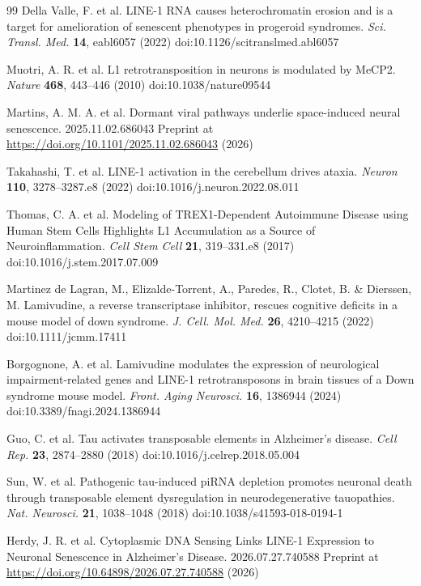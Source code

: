 \documentclass[11pt,twocolumn,twoside]{extarticle}
\begin{document}
\begin{thebibliography}{99}
 Della Valle, F. et al. LINE-1 RNA causes heterochromatin erosion and is a target for amelioration of senescent phenotypes in progeroid syndromes. \textit{Sci. Transl. Med.} \textbf{14}, eabl6057 (2022) doi:10.1126/scitranslmed.abl6057

 Muotri, A. R. et al. L1 retrotransposition in neurons is modulated by MeCP2. \textit{Nature} \textbf{468}, 443--446 (2010) doi:10.1038/nature09544

 Martins, A. M. A. et al. Dormant viral pathways underlie space-induced neural senescence. 2025.11.02.686043 Preprint at \url{https://doi.org/10.1101/2025.11.02.686043} (2026)

 Takahashi, T. et al. LINE-1 activation in the cerebellum drives ataxia. \textit{Neuron} \textbf{110}, 3278--3287.e8 (2022) doi:10.1016/j.neuron.2022.08.011

 Thomas, C. A. et al. Modeling of TREX1-Dependent Autoimmune Disease using Human Stem Cells Highlights L1 Accumulation as a Source of Neuroinflammation. \textit{Cell Stem Cell} \textbf{21}, 319--331.e8 (2017) doi:10.1016/j.stem.2017.07.009

 Martinez de Lagran, M., Elizalde-Torrent, A., Paredes, R., Clotet, B. \& Dierssen, M. Lamivudine, a reverse transcriptase inhibitor, rescues cognitive deficits in a mouse model of down syndrome. \textit{J. Cell. Mol. Med.} \textbf{26}, 4210--4215 (2022) doi:10.1111/jcmm.17411

 Borgognone, A. et al. Lamivudine modulates the expression of neurological impairment-related genes and LINE-1 retrotransposons in brain tissues of a Down syndrome mouse model. \textit{Front. Aging Neurosci.} \textbf{16}, 1386944 (2024) doi:10.3389/fnagi.2024.1386944

 Guo, C. et al. Tau activates transposable elements in Alzheimer's disease. \textit{Cell Rep.} \textbf{23}, 2874--2880 (2018) doi:10.1016/j.celrep.2018.05.004

 Sun, W. et al. Pathogenic tau-induced piRNA depletion promotes neuronal death through transposable element dysregulation in neurodegenerative tauopathies. \textit{Nat. Neurosci.} \textbf{21}, 1038--1048 (2018) doi:10.1038/s41593-018-0194-1

 Herdy, J. R. et al. Cytoplasmic DNA Sensing Links LINE-1 Expression to Neuronal Senescence in Alzheimer's Disease. 2026.07.27.740588 Preprint at \url{https://doi.org/10.64898/2026.07.27.740588} (2026)


\end{thebibliography}
\end{document}
